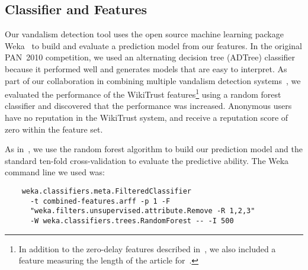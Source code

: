 \newcommand{\sign}{{{\textrm{sign}}}}

\subsection{Classifier and Features}

Our vandalism detection tool uses the open source machine learning
package Weka~\cite{Weka09} to build and evaluate a prediction model from
our features.
In the original PAN~2010 competition, we used an alternating decision
tree (ADTree) classifier~\cite{Adler2010b} because it performed well and
generates models that are easy to interpret.
As part of our collaboration in combining multiple vandalism detection
systems~\cite{Adler2011a}, we evaluated the performance of the
WikiTrust features\footnote{In addition to the zero-delay features
described in~\cite{Adler2010b}, we also included a feature measuring the
length of the article for~\cite{Adler2011a}.}
using a random forest classifier and discovered that the performance was
increased.
Anonymous users have no reputation in the WikiTrust system, and receive
a reputation score of zero within the feature set.

As in~\cite{Adler2011a}, we use the random forest algorithm to build our
prediction model and the standard ten-fold cross-validation to evaluate
the predictive ability.
The Weka command line we used was:
%
{\small
\begin{verbatim}
    weka.classifiers.meta.FilteredClassifier
      -t combined-features.arff -p 1 -F
      "weka.filters.unsupervised.attribute.Remove -R 1,2,3"
      -W weka.classifiers.trees.RandomForest -- -I 500
\end{verbatim}
}

